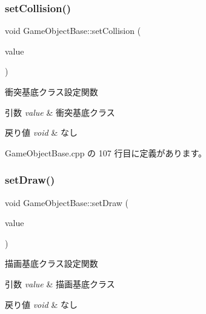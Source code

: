 \subsubsection{\texorpdfstring{set\+Collision()}{setCollision()}}
{\footnotesize\ttfamily void Game\+Object\+Base\+::set\+Collision (\begin{DoxyParamCaption}\item[{\mbox{\hyperlink{class_collision_base}{Collision\+Base}} $\ast$}]{value }\end{DoxyParamCaption})}



衝突基底クラス設定関数 


\begin{DoxyParams}{引数}
{\em value} & 衝突基底クラス \\
\hline
\end{DoxyParams}

\begin{DoxyRetVals}{戻り値}
{\em void} & なし \\
\hline
\end{DoxyRetVals}


 Game\+Object\+Base.\+cpp の 107 行目に定義があります。

\mbox{\label{class_game_object_base_ab771c9ebbca42ccc5ffdee4b3e2e47c5}} 
\subsubsection{\texorpdfstring{set\+Draw()}{setDraw()}}
{\footnotesize\ttfamily void Game\+Object\+Base\+::set\+Draw (\begin{DoxyParamCaption}\item[{\mbox{\hyperlink{class_draw_base}{Draw\+Base}} $\ast$}]{value }\end{DoxyParamCaption})}



描画基底クラス設定関数 


\begin{DoxyParams}{引数}
{\em value} & 描画基底クラス \\
\hline
\end{DoxyParams}

\begin{DoxyRetVals}{戻り値}
{\em void} & なし \\
\hline
\end{DoxyRetVals}


